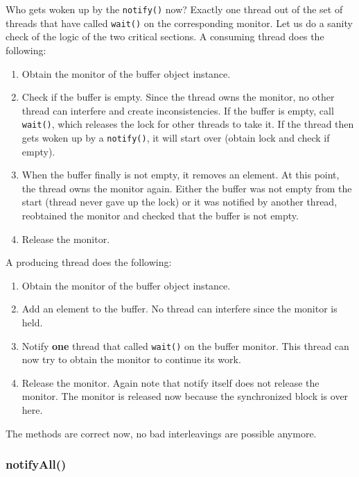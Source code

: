 \documentclass[main.tex]{subfiles}
\begin{document}
Who gets woken up by the \texttt{notify()} now? Exactly one thread out of the set of threads that have called \texttt{wait()} on the corresponding monitor. Let us do a sanity check of the logic of the two critical sections. A consuming thread does the following:
\begin{enumerate}
    \item Obtain the monitor of the buffer object instance.
    \item Check if the buffer is empty. Since the thread owns the monitor, no other thread can interfere and create inconsistencies. If the buffer is empty, call \texttt{wait()}, which releases the lock for other threads to take it. If the thread then gets woken up by a \texttt{notify()}, it will start over (obtain lock and check if empty).
    \item When the buffer finally is not empty, it removes an element. At this point, the thread owns the monitor again. Either the buffer was not empty from the start (thread never gave up the lock) or it was notified by another thread, reobtained the monitor and checked that the buffer is not empty.
    \item Release the monitor.
\end{enumerate}
A producing thread does the following:
\begin{enumerate}
    \item Obtain the monitor of the buffer object instance.
    \item Add an element to the buffer. No thread can interfere since the monitor is held.
    \item Notify \textbf{one} thread that called \texttt{wait()} on the buffer monitor. This thread can now try to obtain the monitor to continue its work.
    \item Release the monitor. Again note that notify itself does not release the monitor. The monitor is released now because the synchronized block is over here.
\end{enumerate}
The methods are correct now, no bad interleavings are possible anymore.

\subsubsection{notifyAll()}
\end{document}
